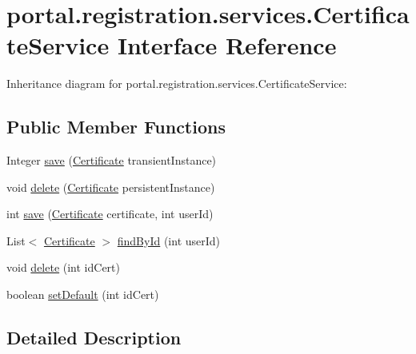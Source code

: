 \hypertarget{interfaceportal_1_1registration_1_1services_1_1CertificateService}{
\section{portal.registration.services.CertificateService Interface Reference}
\label{interfaceportal_1_1registration_1_1services_1_1CertificateService}
}


Inheritance diagram for portal.registration.services.CertificateService:
\subsection*{Public Member Functions}
\begin{DoxyCompactItemize}
\item 
Integer \hyperlink{interfaceportal_1_1registration_1_1services_1_1CertificateService_a83013e7c634e5103c7bc21e961243b91}{save} (\hyperlink{classportal_1_1registration_1_1domain_1_1Certificate}{Certificate} transientInstance)
\item 
void \hyperlink{interfaceportal_1_1registration_1_1services_1_1CertificateService_a38c935159bdcb93abdb8ae5f37a72b82}{delete} (\hyperlink{classportal_1_1registration_1_1domain_1_1Certificate}{Certificate} persistentInstance)
\item 
int \hyperlink{interfaceportal_1_1registration_1_1services_1_1CertificateService_a3108e28c65788d0157a991abf6a4adc7}{save} (\hyperlink{classportal_1_1registration_1_1domain_1_1Certificate}{Certificate} certificate, int userId)
\item 
List$<$ \hyperlink{classportal_1_1registration_1_1domain_1_1Certificate}{Certificate} $>$ \hyperlink{interfaceportal_1_1registration_1_1services_1_1CertificateService_a6e2ec6680c5fe99c57210c58567e5df1}{findById} (int userId)
\item 
void \hyperlink{interfaceportal_1_1registration_1_1services_1_1CertificateService_a630898254fc5fe77e4b959ebb4fa0e6e}{delete} (int idCert)
\item 
boolean \hyperlink{interfaceportal_1_1registration_1_1services_1_1CertificateService_a31323ccb59ca777ac0bc7341454cbb07}{setDefault} (int idCert)
\end{DoxyCompactItemize}


\subsection{Detailed Description}


